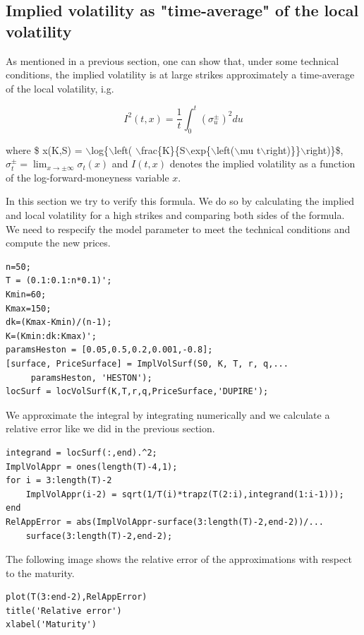 \subsection{Implied volatility as "time-average" of the local volatility}

\begin{par}
As mentioned in a previous section, one can show that, under some technical conditions, the implied volatility is at large strikes approximately a time-average of the local volatility, i.g.
\end{par} \vspace{1em}
\begin{par}
$$I^2(t,x)=\frac{1}{t} \int_0^t (\sigma_u^\pm )^2du$$
\end{par} \vspace{1em}
\begin{par}
where \$ x(K,S) = \ensuremath{\backslash}log\{\ensuremath{\backslash}left( \ensuremath{\backslash}frac\{K\}\{S\ensuremath{\backslash}exp\{\ensuremath{\backslash}left(\ensuremath{\backslash}mu t\ensuremath{\backslash}right)\}\}\ensuremath{\backslash}right)\}\$, $\sigma_t^\pm=\lim_{x\to\pm\infty}\sigma_t(x)$ and $I(t,x)$ denotes the implied volatility as a function of the log-forward-moneyness variable $x$.
\end{par} \vspace{1em}
\begin{par}
In this section we try to verify this formula. We do so by calculating the implied and local volatility for a high strikes and comparing both sides of the formula. We need to respecify the model parameter to meet the technical conditions and compute the new prices.
\end{par} \vspace{1em}
\begin{verbatim}
n=50;
T = (0.1:0.1:n*0.1)';
Kmin=60;
Kmax=150;
dk=(Kmax-Kmin)/(n-1);
K=(Kmin:dk:Kmax)';
paramsHeston = [0.05,0.5,0.2,0.001,-0.8];
[surface, PriceSurface] = ImplVolSurf(S0, K, T, r, q,...
	 paramsHeston, 'HESTON');
locSurf = locVolSurf(K,T,r,q,PriceSurface,'DUPIRE');
\end{verbatim}
\begin{par}
We approximate the integral by integrating numerically and we calculate a relative error like we did in the previous section.
\end{par} \vspace{1em}
\begin{verbatim}
integrand = locSurf(:,end).^2;
ImplVolAppr = ones(length(T)-4,1);
for i = 3:length(T)-2
    ImplVolAppr(i-2) = sqrt(1/T(i)*trapz(T(2:i),integrand(1:i-1)));
end
RelAppError = abs(ImplVolAppr-surface(3:length(T)-2,end-2))/...
	surface(3:length(T)-2,end-2);
\end{verbatim}
\begin{par}
The following image shows the relative error of the approximations with respect to the maturity.
\end{par} \vspace{1em}
\begin{verbatim}
plot(T(3:end-2),RelAppError)
title('Relative error')
xlabel('Maturity')
\end{verbatim}

